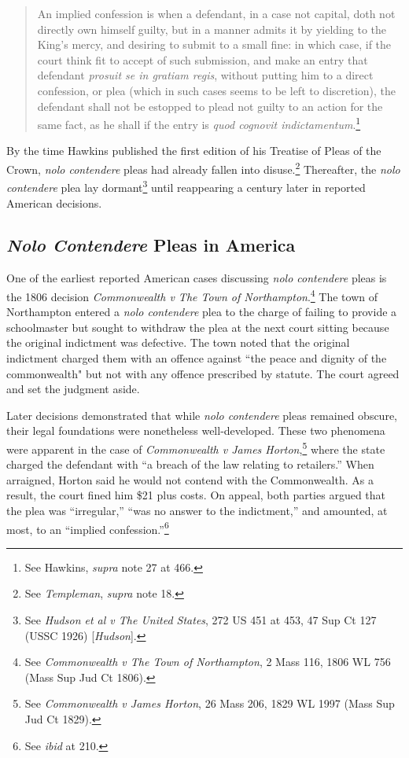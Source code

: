 \begin{quote}
\singlespacing
An implied confession is when a defendant, in a case not capital, doth not directly own himself guilty, but in a manner admits it by yielding to the King's mercy, and desiring to submit to a small fine: in which case, if the court think fit to accept of such submission, and make an entry that defendant \textit{prosuit se in gratiam regis}, without putting him to a direct confession, or plea (which in such cases seems to be left to discretion), the defendant shall not be estopped to plead not guilty to an action for the same fact, as he shall if the entry is \textit{quod cognovit indictamentum}.\footnote{See Hawkins, \textit{supra} note 27 at 466.}
\end{quote}
By the time Hawkins published the first edition of his Treatise of Pleas of the Crown, \textit{nolo contendere} pleas had already fallen into disuse.\footnote{See \textit{Templeman}, \textit{supra} note 18.} Thereafter, the \textit{nolo contendere} plea lay dormant\footnote{See \textit{Hudson et al v The United States}, 272 US 451 at 453, 47 Sup Ct 127 (USSC 1926) [\textit{Hudson}].} until reappearing a century later in reported American decisions.

\subsection{\textit{Nolo Contendere} Pleas in America}

One of the earliest reported American cases discussing \textit{nolo contendere} pleas is the 1806 decision \textit{Commonwealth v The Town of Northampton}.\footnote{See \textit{Commonwealth v The Town of Northampton}, 2 Mass 116, 1806 WL 756 (Mass Sup Jud Ct 1806).} The town of Northampton entered a \textit{nolo contendere} plea to the charge of failing to provide a schoolmaster but sought to withdraw the plea at the next court sitting because the original indictment was defective. The town noted that the original indictment charged them with an offence against ``the peace and dignity of the commonwealth" but not with any offence prescribed by statute. The court agreed and set the judgment aside.

Later decisions demonstrated that while \textit{nolo contendere} pleas remained obscure, their legal foundations were nonetheless well-developed. These two phenomena were apparent in the case of \textit{Commonwealth v James Horton},\footnote{See \textit{Commonwealth v James Horton}, 26 Mass 206, 1829 WL 1997 (Mass Sup Jud Ct 1829).} where the state charged the defendant with ``a breach of the law relating to retailers.'' When arraigned, Horton said he would not contend with the Commonwealth. As a result, the court fined him \$21 plus costs. On appeal, both parties argued that the plea was ``irregular,'' ``was no answer to the indictment,'' and amounted, at most, to an ``implied confession.''\footnote{See \textit{ibid} at 210.} 

